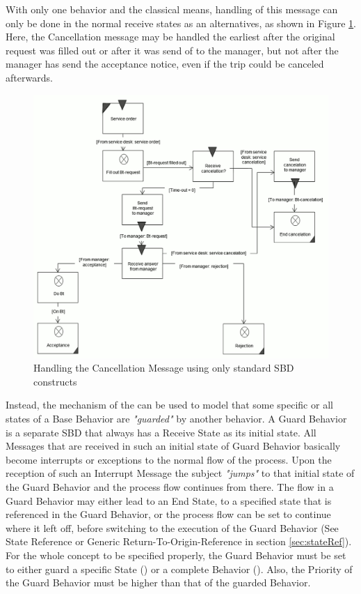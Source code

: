 With only one behavior and the classical means, handling of this message can only be done in the normal receive states as an alternatives, as shown in Figure \ref{fig:exceptionhandling}. Here, the Cancellation message may be handled the earliest after the original request was filled out or after it was send of to the manager, but not after the manager has send the acceptance notice, even if the trip could be canceled afterwards.


\begin{figure}[htbp]
	\centering
	\includegraphics[width=0.7\linewidth]{Figures/Ontology/SubjectBehavior/ExceptionHandling}
	\caption[Handling the Cancellation Message using only standard SBD constructs]{Handling the Cancellation Message using only standard SBD constructs}
	\label{fig:exceptionhandling}
\end{figure}

Instead, the mechanism of the  can be used to model that some specific or all states of a Base Behavior are \textit{"guarded"} by another behavior. A Guard Behavior is a separate SBD that always has a Receive State as its initial state. All Messages that are received in such an initial state of Guard Behavior basically become interrupts or exceptions to the normal flow of the process. Upon the reception of such an Interrupt Message the subject \textit{"jumps"} to that initial state of the Guard Behavior and the process flow continues from there. The flow in a Guard Behavior may either lead to an End State, to a specified state that is referenced in the Guard Behavior, or the process flow can be set to continue where it left off, before switching to the execution of the Guard Behavior (See State Reference or Generic Return-To-Origin-Reference in section \ref{sec:stateRef}). For the whole concept to be specified properly,  the Guard Behavior must be set to either guard a specific State () or a complete Behavior (). Also, the Priority of the Guard Behavior must be higher than that of the guarded Behavior. 

